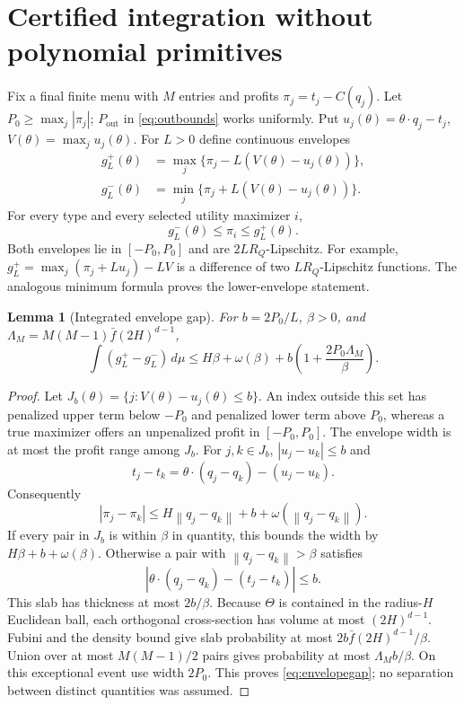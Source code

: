 \documentclass[11pt,a4paper]{article}
\numberwithin{equation}{section}
\newtheorem{lemma}[theorem]{Lemma}
\newcommand{\norm}[1]{\left\lVert #1\right\rVert}
\begin{document}
\section{Certified integration without polynomial primitives}\label{sec:envelopes}
Fix a final finite menu with \(M\) entries and profits
\(\pi_j=t_j-C(q_j)\). Let \(P_0\ge\max_j|\pi_j|\);
\(P_{\mathrm{out}}\) in \eqref{eq:outbounds} works uniformly.
Put \(u_j(\theta)=\theta\cdot q_j-t_j\), \(V(\theta)=\max_j u_j(\theta)\).
For \(L>0\) define continuous envelopes
\begin{align*}
 g_L^+(\theta)&=\max_j\{\pi_j-L(V(\theta)-u_j(\theta))\},\\
 g_L^-(\theta)&=\min_j\{\pi_j+L(V(\theta)-u_j(\theta))\}.
\end{align*}
For every type and every selected utility maximizer \(i\),
\begin{equation}\label{eq:envelopepoint}
 g_L^-(\theta)\le\pi_i\le g_L^+(\theta).
\end{equation}
Both envelopes lie in \([-P_0,P_0]\) and are \(2LR_Q\)-Lipschitz.
For example,
\(g_L^+=\max_j(\pi_j+Lu_j)-LV\) is a difference of two
\(LR_Q\)-Lipschitz functions. The analogous minimum formula proves
the lower-envelope statement.

\begin{lemma}[Integrated envelope gap]\label{lem:envelope}
For \(b=2P_0/L\), \(\beta>0\), and
\(\Lambda_M=M(M-1)\bar f(2H)^{d-1}\),
\begin{equation}\label{eq:envelopegap}
 \int(g_L^+-g_L^-)\,d\mu
 \le H\beta+\omega(\beta)
       +b\left(1+\frac{2P_0\Lambda_M}{\beta}\right).
\end{equation}
\end{lemma}
\begin{proof}
Let \(J_b(\theta)=\{j:V(\theta)-u_j(\theta)\le b\}\).
An index outside this set has penalized upper term below \(-P_0\)
and penalized lower term above \(P_0\), whereas a true maximizer
offers an unpenalized profit in \([-P_0,P_0]\).
The envelope width is at most the profit range among \(J_b\).
For \(j,k\in J_b\), \(|u_j-u_k|\le b\) and
\[
 t_j-t_k=\theta\cdot(q_j-q_k)-(u_j-u_k).
\]
Consequently
\[
 |\pi_j-\pi_k|
 \le H\norm{q_j-q_k}+b+\omega(\norm{q_j-q_k}).
\]
If every pair in \(J_b\) is within \(\beta\) in quantity, this bounds
the width by \(H\beta+b+\omega(\beta)\).
Otherwise a pair with \(\norm{q_j-q_k}>\beta\) satisfies
\[
 |\theta\cdot(q_j-q_k)-(t_j-t_k)|\le b.
\]
This slab has thickness at most \(2b/\beta\).
Because \(\Theta\) is contained in the radius-\(H\) Euclidean ball,
each orthogonal cross-section has volume at most \((2H)^{d-1}\).
Fubini and the density bound give slab probability at most
\(2b\bar f(2H)^{d-1}/\beta\).
Union over at most \(M(M-1)/2\) pairs gives probability at most
\(\Lambda_Mb/\beta\).
On this exceptional event use width \(2P_0\).
This proves \eqref{eq:envelopegap}; no separation between distinct
quantities was assumed.
\end{proof}
\end{document}
